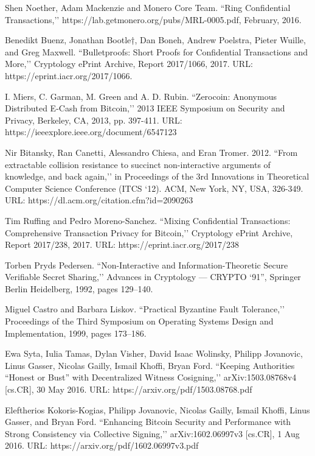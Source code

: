 \documentclass[8pt,fleqn,openany]{book}
\begin{document}
\begin{CJK*}{UTF8}{gbsn}
{\begin{thebibliography}{99}
 Shen Noether, Adam Mackenzie and Monero Core Team. ``Ring Confidential Transactions,’’ https://lab.getmonero.org/pubs/MRL-0005.pdf, February, 2016.

 Benedikt Buenz, Jonathan Bootle†, Dan Boneh, Andrew Poelstra, Pieter Wuille, and Greg Maxwell. ``Bulletproofs: Short Proofs for Confidential Transactions and More,’’ Cryptology ePrint Archive, Report 2017/1066, 2017. URL: https://eprint.iacr.org/2017/1066.

 I. Miers, C. Garman, M. Green and A. D. Rubin. ``Zerocoin: Anonymous Distributed E-Cash from Bitcoin,’’ 2013 IEEE Symposium on Security and Privacy, Berkeley, CA, 2013, pp. 397-411. URL: https://ieeexplore.ieee.org/document/6547123

 Nir Bitansky, Ran Canetti, Alessandro Chiesa, and Eran Tromer. 2012. ``From extractable collision resistance to succinct non-interactive arguments of knowledge, and back again,’’ in Proceedings of the 3rd Innovations in Theoretical Computer Science Conference (ITCS ‘12). ACM, New York, NY, USA, 326-349. URL: https://dl.acm.org/citation.cfm?id=2090263

 Tim Ruffing and Pedro Moreno-Sanchez. ``Mixing Confidential Transactions: Comprehensive Transaction Privacy for Bitcoin,’’ Cryptology ePrint Archive, Report 2017/238, 2017. URL: https://eprint.iacr.org/2017/238

 Torben Pryds Pedersen. ``Non-Interactive and Information-Theoretic Secure Verifiable Secret Sharing,’’ Advances in Cryptology — CRYPTO ‘91”, Springer Berlin Heidelberg, 1992, pages 129–140.

 Miguel Castro and Barbara Liskov. ``Practical Byzantine Fault Tolerance,’’ Proceedings of the Third Symposium on Operating Systems Design and Implementation, 1999, pages 173–186. 

 Ewa Syta, Iulia Tamas, Dylan Visher, David Isaac Wolinsky, Philipp Jovanovic, Linus Gasser, Nicolas Gailly, Ismail Khoffi, Bryan Ford. ``Keeping Authorities “Honest or Bust” with Decentralized Witness Cosigning,’’ arXiv:1503.08768v4 [cs.CR], 30 May 2016. URL: https://arxiv.org/pdf/1503.08768.pdf

 Eleftherios Kokoris-Kogias, Philipp Jovanovic, Nicolas Gailly,
Ismail Khoffi, Linus Gasser, and Bryan Ford. ``Enhancing Bitcoin Security and Performance with Strong Consistency via Collective Signing,’’ arXiv:1602.06997v3 [cs.CR], 1 Aug 2016. URL: https://arxiv.org/pdf/1602.06997v3.pdf


\end{thebibliography}}
\end{CJK*}
\end{document}
